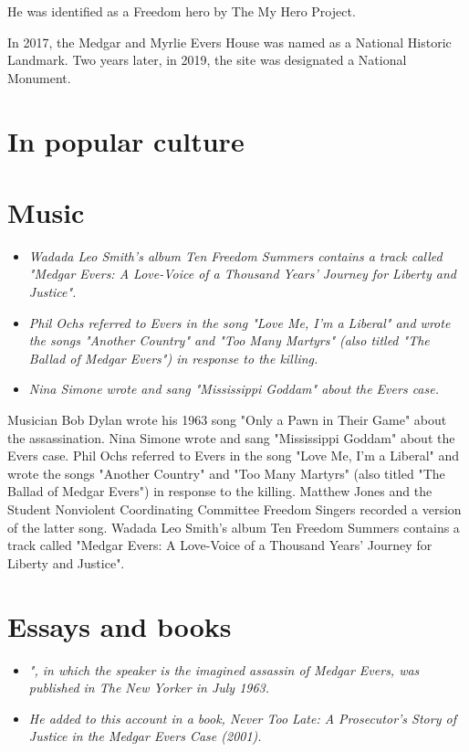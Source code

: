 He was identified as a Freedom hero by The My Hero Project.

In 2017, the Medgar and Myrlie Evers House was named as a National
Historic Landmark. Two years later, in 2019, the site was designated a
National Monument.

\section{In popular culture}\label{in-popular-culture}

\section{Music}\label{music}

\begin{itemize}
\item
  \emph{Wadada Leo Smith's album Ten Freedom Summers contains a track
  called "Medgar Evers: A Love-Voice of a Thousand Years' Journey for
  Liberty and Justice".}
\item
  \emph{Phil Ochs referred to Evers in the song "Love Me, I'm a Liberal"
  and wrote the songs "Another Country" and "Too Many Martyrs" (also
  titled "The Ballad of Medgar Evers") in response to the killing.}
\item
  \emph{Nina Simone wrote and sang "Mississippi Goddam" about the Evers
  case.}
\end{itemize}

Musician Bob Dylan wrote his 1963 song "Only a Pawn in Their Game" about
the assassination. Nina Simone wrote and sang "Mississippi Goddam" about
the Evers case. Phil Ochs referred to Evers in the song "Love Me, I'm a
Liberal" and wrote the songs "Another Country" and "Too Many Martyrs"
(also titled "The Ballad of Medgar Evers") in response to the killing.
Matthew Jones and the Student Nonviolent Coordinating Committee Freedom
Singers recorded a version of the latter song. Wadada Leo Smith's album
Ten Freedom Summers contains a track called "Medgar Evers: A Love-Voice
of a Thousand Years' Journey for Liberty and Justice".

\section{Essays and books}\label{essays-and-books}

\begin{itemize}
\item
  \emph{", in which the speaker is the imagined assassin of Medgar
  Evers, was published in The New Yorker in July 1963.}
\item
  \emph{He added to this account in a book, Never Too Late: A
  Prosecutor's Story of Justice in the Medgar Evers Case (2001).}
\end{itemize}

